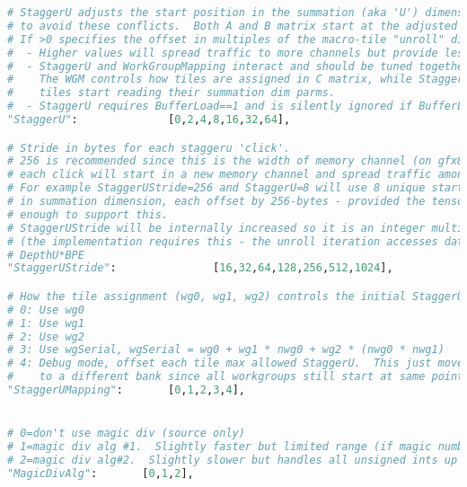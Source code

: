 \documentclass[]{article}
\begin{document}
\begin{lstlisting}[language=python,breaklines=true]
# StaggerU adjusts the start position in the summation (aka 'U') dimension
# to avoid these conflicts.  Both A and B matrix start at the adjusted position.
# If >0 specifies the offset in multiples of the macro-tile "unroll" dim
#  - Higher values will spread traffic to more channels but provide less L2 re-use.
#  - StaggerU and WorkGroupMapping interact and should be tuned together -
#    The WGM controls how tiles are assigned in C matrix, while StaggerU controls where those
#    tiles start reading their summation dim parms.
#  - StaggerU requires BufferLoad==1 and is silently ignored if BufferLoad==0
"StaggerU":              [0,2,4,8,16,32,64],

# Stride in bytes for each staggeru 'click'.
# 256 is recommended since this is the width of memory channel (on gfx803,gfx900,gf906) - so
# each click will start in a new memory channel and spread traffic among the 16 available channels.
# For example StaggerUStride=256 and StaggerU=8 will use 8 unique starting points
# in summation dimension, each offset by 256-bytes - provided the tensor dims are large
# enough to support this.
# StaggerUStride will be internally increased so it is an integer multiple of DepthU*BpeAB.
# (the implementation requires this - the unroll iteration accesses data in steps of
# DepthU*BPE
"StaggerUStride":               [16,32,64,128,256,512,1024],

# How the tile assignment (wg0, wg1, wg2) controls the initial StaggerU offset:
# 0: Use wg0
# 1: Use wg1
# 2: Use wg2
# 3: Use wgSerial, wgSerial = wg0 + wg1 * nwg0 + wg2 * (nwg0 * nwg1)
# 4: Debug mode, offset each tile max allowed StaggerU.  This just moves hotspot
#    to a different bank since all workgroups still start at same point.
"StaggerUMapping":       [0,1,2,3,4],


# 0=don't use magic div (source only)
# 1=magic div alg #1.  Slightly faster but limited range (if magic number is 2^32)
# 2=magic div alg#2.  Slightly slower but handles all unsigned ints up to 2^32
"MagicDivAlg":       [0,1,2],


\end{lstlisting}
\end{document}
